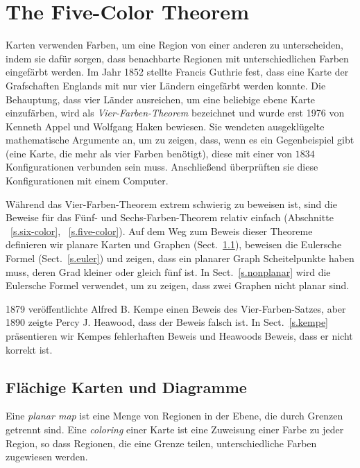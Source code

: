 
\chapter{The Five-Color Theorem}\label{c.five}


Karten verwenden Farben, um eine Region von einer anderen zu unterscheiden, indem sie dafür sorgen, dass benachbarte Regionen mit unterschiedlichen Farben eingefärbt werden. Im Jahr 1852 stellte Francis Guthrie fest, dass eine Karte der Grafschaften Englands mit nur vier Ländern eingefärbt werden konnte. Die Behauptung, dass vier Länder ausreichen, um eine beliebige ebene Karte einzufärben, wird als \emph{Vier-Farben-Theorem} bezeichnet und wurde erst 1976 von Kenneth Appel und Wolfgang Haken bewiesen. Sie wendeten ausgeklügelte mathematische Argumente an, um zu zeigen, dass, wenn es ein Gegenbeispiel gibt (eine Karte, die mehr als vier Farben benötigt), diese mit einer von $1834$ Konfigurationen verbunden sein muss. Anschließend überprüften sie diese Konfigurationen mit einem Computer.

Während das Vier-Farben-Theorem extrem schwierig zu beweisen ist, sind die Beweise für das Fünf- und Sechs-Farben-Theorem relativ einfach (Abschnitte ~\ref{s.six-color}, ~\ref{s.five-color}). Auf dem Weg zum Beweis dieser Theoreme definieren wir planare Karten und Graphen (Sect.~\ref{s.planar}), beweisen die Eulersche Formel (Sect.~\ref{s.euler}) und zeigen, dass ein planarer Graph Scheitelpunkte haben muss, deren Grad kleiner oder gleich fünf ist. In Sect.~\ref{s.nonplanar} wird die Eulersche Formel verwendet, um zu zeigen, dass zwei Graphen nicht planar sind.

1879 veröffentlichte Alfred B. Kempe einen Beweis des Vier-Farben-Satzes, aber 1890 zeigte Percy J. Heawood, dass der Beweis falsch ist. In Sect.~\ref{s.kempe} präsentieren wir Kempes fehlerhaften Beweis und Heawoods Beweis, dass er nicht korrekt ist.

\section{Flächige Karten und Diagramme}\label{s.planar}

\begin{definition}
Eine \textit{planar map} ist eine Menge von Regionen in der Ebene, die durch Grenzen getrennt sind. Eine \textit{coloring} einer Karte ist eine Zuweisung einer Farbe zu jeder Region, so dass Regionen, die eine Grenze teilen, unterschiedliche Farben zugewiesen werden.
\end{definition}


